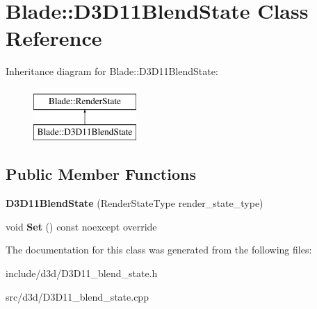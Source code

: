 \hypertarget{class_blade_1_1_d3_d11_blend_state}{}\section{Blade\+:\+:D3\+D11\+Blend\+State Class Reference}
\label{class_blade_1_1_d3_d11_blend_state}
Inheritance diagram for Blade\+:\+:D3\+D11\+Blend\+State\+:\begin{figure}[H]
\begin{center}
\leavevmode
\includegraphics[height=2.000000cm]{class_blade_1_1_d3_d11_blend_state}
\end{center}
\end{figure}
\subsection*{Public Member Functions}
\begin{DoxyCompactItemize}
\item 
\mbox{\label{class_blade_1_1_d3_d11_blend_state_a26513402cbc6899842e94c38613891af}} 
{\bfseries D3\+D11\+Blend\+State} (Render\+State\+Type render\+\_\+state\+\_\+type)
\item 
\mbox{\label{class_blade_1_1_d3_d11_blend_state_aea6b470c8d2c45d8dde3da2260de66f9}} 
void {\bfseries Set} () const noexcept override
\end{DoxyCompactItemize}


The documentation for this class was generated from the following files\+:\begin{DoxyCompactItemize}
\item 
include/d3d/D3\+D11\+\_\+blend\+\_\+state.\+h\item 
src/d3d/D3\+D11\+\_\+blend\+\_\+state.\+cpp\end{DoxyCompactItemize}
